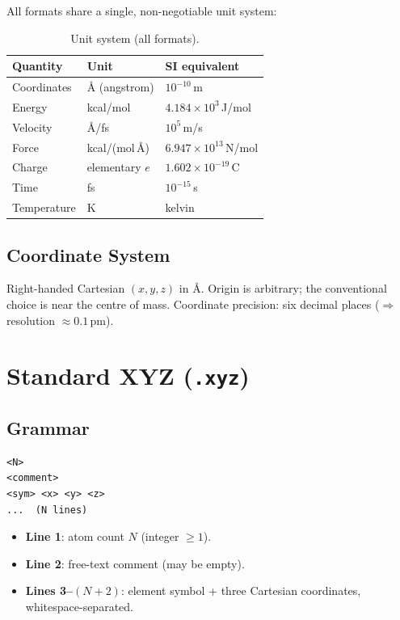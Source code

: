 \documentclass[12pt, a4paper, oneside]{article}
\begin{document}
All formats share a single, non-negotiable unit system:

\begin{table}[htbp]
  \centering
  \caption{Unit system (all formats).}
  \label{tab:units}
  \begin{tabular}{lll}
    \toprule
    Quantity & Unit & SI equivalent \\
    \midrule
    Coordinates   & \AA{} (angstrom) & $10^{-10}$\,m \\
    Energy        & kcal/mol         & $4.184 \times 10^{3}$\,J/mol \\
    Velocity      & \AA/fs           & $10^{5}$\,m/s \\
    Force         & kcal/(mol\,\AA)  & $6.947 \times 10^{13}$\,N/mol \\
    Charge        & elementary $e$   & $1.602 \times 10^{-19}$\,C \\
    Time          & fs               & $10^{-15}$\,s \\
    Temperature   & K                & kelvin \\
    \bottomrule
  \end{tabular}
\end{table}

\subsection{Coordinate System}

Right-handed Cartesian $(x, y, z)$ in \AA.  Origin is arbitrary;
the conventional choice is near the centre of mass.  Coordinate
precision: six decimal places ($\Rightarrow$ resolution $\approx 0.1$\,pm).

\section{Standard XYZ (\texttt{.xyz})}
\label{sec:xyz}

\subsection{Grammar}

\begin{lstlisting}[language={},frame=single]
<N>
<comment>
<sym> <x> <y> <z>
...  (N lines)
\end{lstlisting}

\begin{itemize}
  \item \textbf{Line 1}: atom count $N$ (integer $\ge 1$).
  \item \textbf{Line 2}: free-text comment (may be empty).
  \item \textbf{Lines 3--$(N{+}2)$}: element symbol + three Cartesian
        coordinates, whitespace-separated.
\end{itemize}
\end{document}

